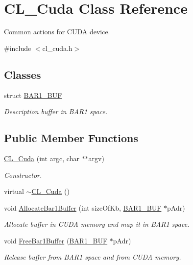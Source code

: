 \hypertarget{classCL__Cuda}{
\section{CL\_\-Cuda Class Reference}
\label{classCL__Cuda}
}


Common actions for CUDA device.  


{\ttfamily \#include $<$cl\_\-cuda.h$>$}\subsection*{Classes}
\begin{DoxyCompactItemize}
\item 
struct \hyperlink{structCL__Cuda_1_1BAR1__BUF}{BAR1\_\-BUF}
\begin{DoxyCompactList}\small\item\em Description buffer in BAR1 space. \item\end{DoxyCompactList}\end{DoxyCompactItemize}
\subsection*{Public Member Functions}
\begin{DoxyCompactItemize}
\item 
\hyperlink{classCL__Cuda_a430d5739977a8d1dcce312be2b1badae}{CL\_\-Cuda} (int argc, char $\ast$$\ast$argv)
\begin{DoxyCompactList}\small\item\em Constructor. \item\end{DoxyCompactList}\item 
virtual \hyperlink{classCL__Cuda_a3dd61a25d699f50fbe4b1891537d73e1}{$\sim$CL\_\-Cuda} ()
\item 
void \hyperlink{classCL__Cuda_a2c2b6f65ee2226a8a11052a84fcebf83}{AllocateBar1Buffer} (int sizeOfKb, \hyperlink{structCL__Cuda_1_1BAR1__BUF}{BAR1\_\-BUF} $\ast$pAdr)
\begin{DoxyCompactList}\small\item\em Allocate buffer in CUDA memory and map it in BAR1 space. \item\end{DoxyCompactList}\item 
void \hyperlink{classCL__Cuda_a2a9874acb9297efde377249468efa043}{FreeBar1Buffer} (\hyperlink{structCL__Cuda_1_1BAR1__BUF}{BAR1\_\-BUF} $\ast$pAdr)
\begin{DoxyCompactList}\small\item\em Release buffer from BAR1 space and from CUDA memory. \item\end{DoxyCompactList}\end{DoxyCompactItemize}

